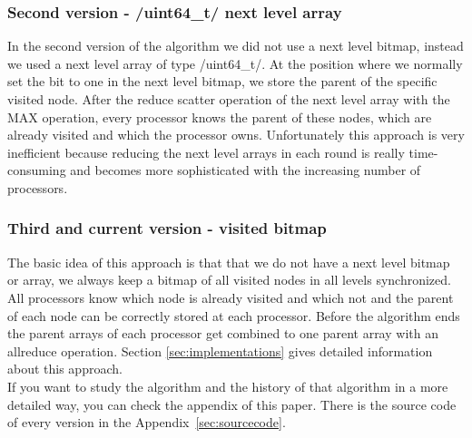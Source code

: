 \documentclass[12pt,a4paper]{article}
\begin{document}
\subsubsection{Second version - \cinline/uint64_t/ next level array}
\label{sec:secondversion}

In the second version of the algorithm we did not use a next level bitmap, instead we used a next level array of type \cinline/uint64_t/. At the position where we normally set the bit to one in the next level bitmap, we store the parent of the specific visited node. After the reduce scatter operation of the next level array with the MAX operation, every processor knows the parent of these nodes, which are already visited and which the processor owns. Unfortunately this approach is very inefficient because reducing the next level arrays in each round is really time-consuming and becomes more sophisticated with the increasing number of processors.

\subsubsection{Third and current version - visited bitmap}
\label{sec:thirdversion}

The basic idea of this approach is that that we do not have a next level bitmap or array, we always keep a bitmap of all visited nodes in all levels synchronized. All processors know which node is already visited and which not and the parent of each node can be correctly stored at each processor. Before the algorithm ends the parent arrays of each processor get combined to one parent array with an allreduce operation. Section \ref{sec:implementations} gives detailed information about this approach.\\
If you want to study the algorithm and the history of that algorithm in a more detailed way, you can check the appendix of this paper. There is the source code of every version in the Appendix~\ref{sec:sourcecode}.
\end{document}
